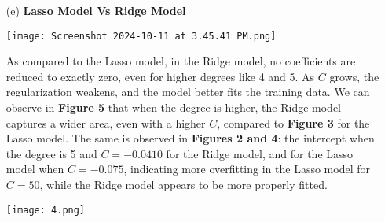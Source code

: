 \documentclass[a4paper,10pt]{article}
\begin{document}
\begin{enumerate}
\item[(e)] \textbf{Lasso Model Vs Ridge Model}
\begin{center}
 \centering
        \texttt{[image: Screenshot 2024-10-11 at 3.45.41 PM.png]}
        \label{fig:scatter-3d}
    \end{center} 
As compared to the Lasso model, in the Ridge model, no coefficients are reduced to exactly zero, even for higher degrees like 4 and 5. As \(C\) grows, the regularization weakens, and the model better fits the training data. We can observe in \textbf{Figure 5} that when the degree is higher, the Ridge model captures a wider area, even with a higher \(C\), compared to \textbf{Figure 3} for the Lasso model. The same is observed in \textbf{Figures 2 and 4}: the intercept when the degree is 5 and \(C = -0.0410\) for the Ridge model, and for the Lasso model when \(C = -0.075\), indicating more overfitting in the Lasso model for \(C = 50\), while the Ridge model appears to be more properly fitted.

    \begin{center}
\centering
        \texttt{[image: 4.png]}
    \end{center}
\end{enumerate}
\end{document}

